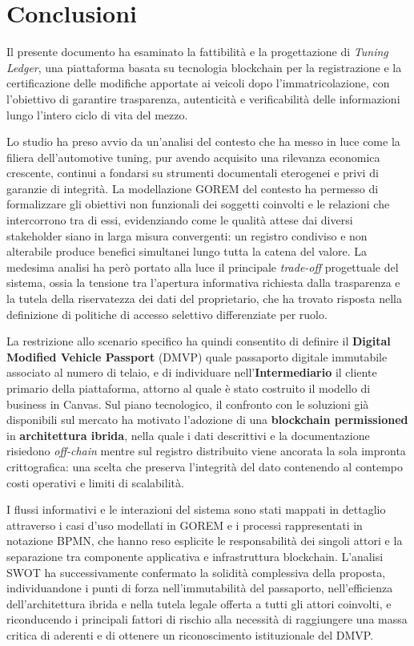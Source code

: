 \chapter{Conclusioni}

Il presente documento ha esaminato la fattibilità e la progettazione di \textit{Tuning Ledger}, una piattaforma basata su tecnologia blockchain per la registrazione e la certificazione delle modifiche apportate ai veicoli dopo l'immatricolazione, con l'obiettivo di garantire trasparenza, autenticit\`a e verificabilit\`a delle informazioni lungo l'intero ciclo di vita del mezzo.

Lo studio ha preso avvio da un'analisi del contesto che ha messo in luce come la filiera dell'automotive tuning, pur avendo acquisito una rilevanza economica crescente, continui a fondarsi su strumenti documentali eterogenei e privi di garanzie di integrit\`a. La modellazione GOREM del contesto ha permesso di formalizzare gli obiettivi non funzionali dei soggetti coinvolti e le relazioni che intercorrono tra di essi, evidenziando come le qualit\`a attese dai diversi stakeholder siano in larga misura convergenti: un registro condiviso e non alterabile produce benefici simultanei lungo tutta la catena del valore. La medesima analisi ha per\`o portato alla luce il principale \textit{trade-off} progettuale del sistema, ossia la tensione tra l'apertura informativa richiesta dalla trasparenza e la tutela della riservatezza dei dati del proprietario, che ha trovato risposta nella definizione di politiche di accesso selettivo differenziate per ruolo.

La restrizione allo scenario specifico ha quindi consentito di definire il \textbf{Digital Modified Vehicle Passport} (DMVP) quale passaporto digitale immutabile associato al numero di telaio, e di individuare nell'\textbf{Intermediario} il cliente primario della piattaforma, attorno al quale \`e stato costruito il modello di business in Canvas. Sul piano tecnologico, il confronto con le soluzioni gi\`a disponibili sul mercato ha motivato l'adozione di una \textbf{blockchain permissioned} in \textbf{architettura ibrida}, nella quale i dati descrittivi e la documentazione risiedono \textit{off-chain} mentre sul registro distribuito viene ancorata la sola impronta crittografica: una scelta che preserva l'integrit\`a del dato contenendo al contempo costi operativi e limiti di scalabilit\`a.

I flussi informativi e le interazioni del sistema sono stati mappati in dettaglio attraverso i casi d'uso modellati in GOREM e i processi rappresentati in notazione BPMN, che hanno reso esplicite le responsabilit\`a dei singoli attori e la separazione tra componente applicativa e infrastruttura blockchain. L'analisi SWOT ha successivamente confermato la solidit\`a complessiva della proposta, individuandone i punti di forza nell'immutabilit\`a del passaporto, nell'efficienza dell'architettura ibrida e nella tutela legale offerta a tutti gli attori coinvolti, e riconducendo i principali fattori di rischio alla necessit\`a di raggiungere una massa critica di aderenti e di ottenere un riconoscimento istituzionale del DMVP.

